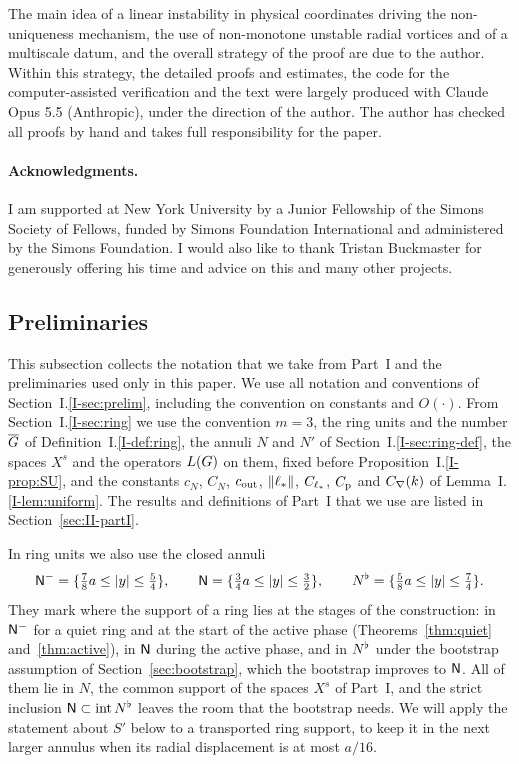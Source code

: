 The main idea of a linear instability in physical coordinates driving the
non-uniqueness mechanism, the use of non-monotone unstable radial vortices and of
a multiscale datum, and the overall strategy of the proof are due to the author.
Within this strategy, the detailed proofs and estimates, the code for the
computer-assisted verification and the text were largely produced with
Claude Opus 5.5 (Anthropic), under the direction of the author. The author has
checked all proofs by hand and takes full responsibility for the paper.

\paragraph{Acknowledgments.} I am supported at New York University by a Junior
Fellowship of the Simons Society of Fellows, funded by Simons Foundation
International and administered by the Simons Foundation. I would also like to thank
Tristan Buckmaster for generously offering his time and advice on this and many
other projects.

\subsection{Preliminaries}
\label{sec:II-prelim}

This subsection collects the notation that we take from Part~I and the
preliminaries used only in this paper. We use all notation and conventions of
Section~I.\ref{I-sec:prelim}, including the convention on constants and
$O(\cdot)$. From
Section~I.\ref{I-sec:ring} we use the convention $m=3$, the ring units and the
number $\overline{G}$ of Definition~I.\ref{I-def:ring}, the annuli $N$ and $N'$ of
Section~I.\ref{I-sec:ring-def}, the spaces $X^s$ and the operators $L(G)$ on
them, fixed before Proposition~I.\ref{I-prop:SU}, and the constants $c_N$, $C_N$,
$c_{\mathrm{out}}$, $\|\ell_*\|$, $C_{\ell_*}$, $C_{\mathrm{p}}$ and $C_{\nabla}(k)$ of
Lemma~I.\ref{I-lem:uniform}. The results and definitions of
Part~I that we use are listed in Section~\ref{sec:II-partI}.

In ring units we also use the closed annuli
\[
\mathsf{N}^{-}=\{\tfrac78a\le|y|\le\tfrac54\},\qquad \mathsf{N}=\{\tfrac34a\le|y|\le\tfrac32\},\qquad
N^{\flat}=\{\tfrac58a\le|y|\le\tfrac74\}.
\]
They mark where the support of a ring lies at the stages of the construction:
in $\mathsf{N}^{-}$ for a quiet ring and at the start of the active phase
(Theorems~\ref{thm:quiet} and~\ref{thm:active}), in $\mathsf{N}$ during the active
phase, and in $N^{\flat}$ under the bootstrap assumption of
Section~\ref{sec:bootstrap}, which the bootstrap improves to $\mathsf{N}$. All of them
lie in $N$, the common support of the spaces $X^s$ of Part~I, and the strict
inclusion $\mathsf{N}\subset\operatorname{int}N^{\flat}$ leaves the room that the bootstrap
needs.
We will apply the statement about $S'$ below to a transported ring support,
to keep it in the next larger annulus when its radial displacement is at most
$a/16$.

